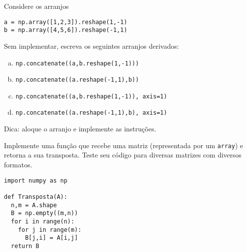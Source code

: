\begin{exer}
  Considere os arranjos

\begin{lstlisting}
a = np.array([1,2,3]).reshape(1,-1)
b = np.array([4,5,6]).reshape(-1,1)
\end{lstlisting}

Sem implementar, escreva os seguintes arranjos derivados:
  \begin{enumerate}[a)]
  \item \lstinline+np.concatenate((a,b.reshape(1,-1)))+
  \item \lstinline+np.concatenate((a.reshape(-1,1),b))+
  \item \lstinline+np.concatenate((a,b.reshape(1,-1)), axis=1)+
  \item \lstinline+np.concatenate((a.reshape(-1,1),b), axis=1)+
  \end{enumerate}
\end{exer}
\begin{resp}
  Dica: aloque o arranjo e implemente as instruções.
\end{resp}

\begin{exer}
  Implemente uma função que recebe uma matriz (representada por um \lstinline+array+) e retorna a sua transposta. Teste seu código para diversas matrizes com diversos formatos.
\end{exer}
\begin{resp}

\begin{lstlisting}
import numpy as np

def Transposta(A):
  n,m = A.shape
  B = np.empty((m,n))
  for i in range(n):
    for j in range(m):
      B[j,i] = A[i,j]
  return B
\end{lstlisting}

\end{resp}

